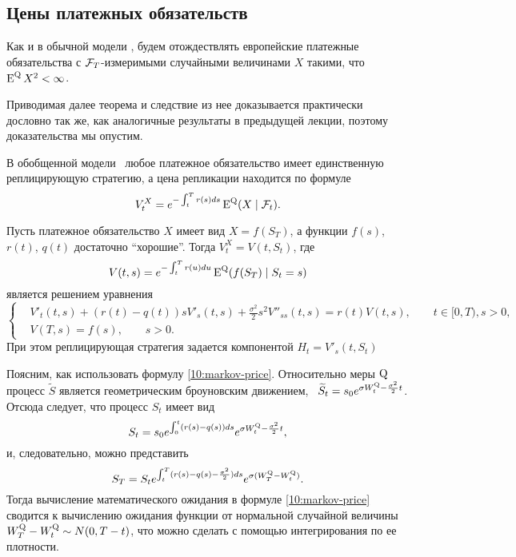 \subsection{Цены платежных обязательств}

Как и в обычной модели \bs, будем отождествлять европейские платежные обязательства с $\mathcal{F}_T$-измеримыми случайными величинами $X$ такими, что $\operatorname{E}^{\mathrm{Q}} X^2 < \infty$.

Приводимая далее теорема и следствие из нее доказывается практически дословно так же, как аналогичные результаты в предыдущей лекции, поэтому доказательства мы опустим.

\begin{theorem}
В обобщенной модели \bs\ любое платежное обязательство имеет единственную реплицирующую стратегию, а цена репликации находится по формуле
\begin{equation}
\label{10:price}
V_t^X = e^{-\int_t^T r(s) ds} \operatorname{E}^{\mathrm{Q}}(X\mid \mathcal{F}_t).
\end{equation}
\end{theorem}

\begin{corollary}
Пусть платежное обязательство $X$ имеет вид $X = f(S_T)$, а функции $f(s)$, $r(t)$, $q(t)$ достаточно ``хорошие''. Тогда $V_t^X = V(t,S_t)$, где
\begin{equation}
\label{10:markov-price}
V(t,s) = e^{-\int_t^T r(u) du} \operatorname{E}^{\mathrm{Q}} (f(S_T) \mid S_t = s)
\end{equation}
является решением уравнения
\[
\left\{
\begin{aligned}
&V'_t(t,s) + (r(t)-q(t))sV'_s(t,s) + \frac{\sigma^2}{2} s^2 V''_{ss}(t,s) = r(t)V(t,s),
  \qquad t\in[0,T), s>0,\\
&V(T,s) = f(s), \qquad s>0.
\end{aligned}
\right.
\]
При этом реплицирующая стратегия задается компонентой $H_t = V'_s(t,S_t)$
\end{corollary}

Поясним, как использовать формулу \eqref{10:markov-price}.
Относительно меры $\mathrm{Q}$ процесс $\tilde S$ является геометрическим броуновским движением, \te\ $\widetilde S_t = s_0 e^{\sigma W_t^{\mathrm{Q}} - \frac{\sigma^2}{2} t}$. Отсюда следует, что процесс $S_t$ имеет вид
\[
S_t = s_0 e^{\int_0^t (r(s)-q(s))ds} e^{\sigma W_t^{\mathrm{Q}} - \frac{\sigma^2}{2} t},
\]
и, следовательно, можно представить
\[
S_T = S_t e^{\int_t^T (r(s)-q(s) - \frac{\sigma^2}{2})ds} e^{\sigma (W_T^{\mathrm{Q}} - W_t^{\mathrm{Q}})}. 
\]
Тогда вычисление математического ожидания в формуле \eqref{10:markov-price} сводится к вычислению ожидания функции от нормальной случайной величины $W_T^{\mathrm{Q}} - W_t^{\mathrm{Q}} \sim N(0,T-t)$, что можно сделать с помощью интегрирования по ее плотности.

